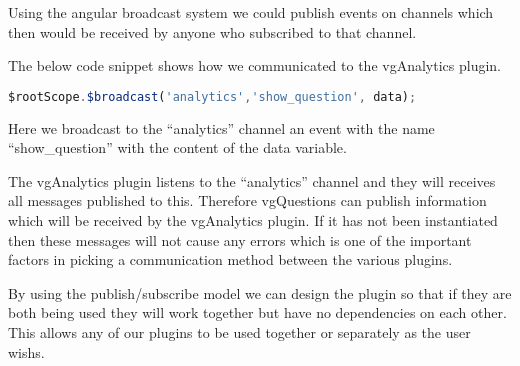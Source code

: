 Using the angular broadcast system we could publish events on channels which then would be received by anyone who subscribed to that channel.

The below code snippet shows how we communicated to the vgAnalytics plugin.

\begin{lstlisting}[language=javascript]
$rootScope.$broadcast('analytics','show_question', data);
\end{lstlisting}

Here we broadcast to the ``analytics'' channel an event with the name ``show\_question'' with the content of the data variable.

The vgAnalytics plugin listens to the ``analytics'' channel and they will receives all messages published to this. Therefore vgQuestions can publish information which will be received by the vgAnalytics plugin. If it has not been instantiated then these messages will not cause any errors which is one of the important factors in picking a communication method between the various plugins.

By using the publish/subscribe model we can design the plugin so that if they are both being used they will work together but have no dependencies on each other. This allows any of our plugins to be used together or separately as the user wishs.
